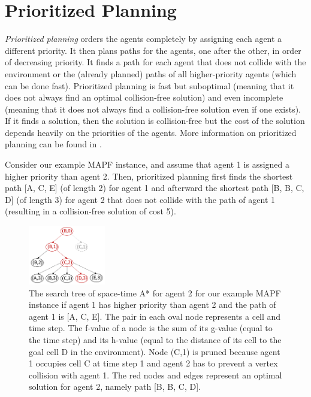 \documentclass[11pt]{article}
\begin{document}
\section{Prioritized Planning}

\emph{Prioritized planning} \cite{Erdm87} orders the agents completely by assigning each agent a different priority. It then plans paths for the agents, one after the other, in order of decreasing priority. It finds a path for each agent that does not collide with the environment or the (already planned) paths of all higher-priority agents (which can be done fast). Prioritized planning is fast but suboptimal (meaning that it does not always find an optimal collision-free solution) and even incomplete (meaning that it does not always find a collision-free solution even if one exists). If it finds a solution, then the solution is collision-free but the cost of the solution depends heavily on the priorities of the agents. More information on prioritized planning can be found in \cite{Ma19}.

Consider our example MAPF instance, and assume that agent 1 is assigned a higher priority than agent 2. Then, prioritized planning first finds the shortest path [A, C, E] (of length 2) for agent 1 and afterward the shortest path [B, B, C, D] (of length 3) for agent 2 that does not collide with the path of agent 1 (resulting in a collision-free solution of cost 5).


\begin{figure}[ht]
\centering
\includegraphics[width=0.3\textwidth]{images/space-time-A.png}
\caption{The search tree of space-time A* for agent 2 for our example MAPF instance if agent 1 has higher priority than agent 2 and the path of agent 1 is [A, C, E]. The pair in each oval node represents a cell and time step. The f-value of a node is the sum of its g-value (equal to the time step) and its h-value (equal to the distance of its cell to the goal cell D in the environment). Node (C,1) is pruned because agent 1 occupies cell C at time step 1 and agent 2 has to prevent a vertex collision with agent 1. The red nodes and edges represent an optimal solution for agent 2, namely path [B, B, C, D].}\label{fig:space-time-A}
\end{figure}
\end{document}
